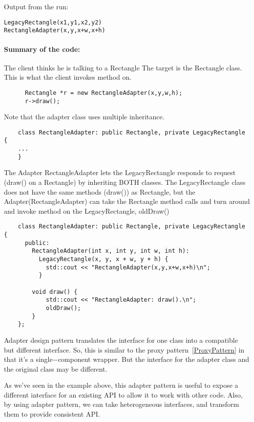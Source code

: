 \documentclass{book}
\begin{document}
Output from the run:
\begin{verbatim}
LegacyRectangle(x1,y1,x2,y2)
RectangleAdapter(x,y,x+w,x+h)
\end{verbatim}

\paragraph{Summary of the code:}

    The client thinks he is talking to a Rectangle
    The target is the Rectangle class. This is what the client invokes method on.

\begin{verbatim}
      Rectangle *r = new RectangleAdapter(x,y,w,h);
      r->draw();
\end{verbatim}
    Note that the adapter class uses multiple inheritance.

\begin{verbatim}
    class RectangleAdapter: public Rectangle, private LegacyRectangle {
    ...
    }
\end{verbatim}
    The Adapter RectangleAdapter lets the LegacyRectangle responds to request (draw() on a Rectangle) by inheriting BOTH classes.
    The LegacyRectangle class does not have the same methods (draw()) as Rectangle,
    but the Adapter(RectangleAdapter) can take the Rectangle method calls and turn around and invoke method on the LegacyRectangle, oldDraw()

\begin{verbatim}
    class RectangleAdapter: public Rectangle, private LegacyRectangle {
      public:
        RectangleAdapter(int x, int y, int w, int h):
          LegacyRectangle(x, y, x + w, y + h) {
    		std::cout << "RectangleAdapter(x,y,x+w,x+h)\n";
    	  }
        
        void draw() {
            std::cout << "RectangleAdapter: draw().\n"; 
            oldDraw();
        }
    };
\end{verbatim}

Adapter design pattern translates the interface for one class into a compatible but different interface.
So, this is similar to the proxy pattern~\ref{ProxyPattern} in that it's a single$-$component wrapper. But the interface for the adapter class and the original class may be different.

As we've seen in the example above, this adapter pattern is useful to expose a different interface for an existing API to allow it to work with other code.
Also, by using adapter pattern, we can take heterogeneous interfaces, and transform them to provide consistent API.
\end{document}
